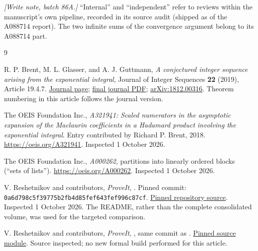 \documentclass[11pt,a4paper]{article}
\numberwithin{equation}{section}
\theoremstyle{definition}
\theoremstyle{remark}
\theoremstyle{definition}
\newcommand{\repoSHA}{\texttt{0a6d798c5f39775b2fb4d85fef643fef996c87cf}}
\begin{document}
\emph{[Write note, batch 86A.]} ``Internal'' and ``independent'' refer to
reviews within the manuscript's own pipeline, recorded in its source
audit (shipped as
 of the A088714 report). The
two infinite sums of the convergence argument belong to its A088714
part.

\begin{thebibliography}{9}

R. P. Brent, M. L. Glasser, and A. J. Guttmann,
\emph{A conjectured integer sequence arising from the exponential integral},
Journal of Integer Sequences \textbf{22} (2019), Article 19.4.7.
\href{https://cs.uwaterloo.ca/journals/JIS/VOL22/Brent/brent21.html}{Journal page};
\href{https://cs.uwaterloo.ca/journals/JIS/VOL22/Brent/brent21.pdf}{final journal PDF};
\href{https://arxiv.org/abs/1812.00316}{arXiv:1812.00316}.
Theorem numbering in this article follows the journal version.

The OEIS Foundation Inc.,
\emph{A321941: Scaled numerators in the asymptotic expansion of the Maclaurin
coefficients in a Hadamard product involving the exponential integral}.
Entry contributed by Richard P. Brent, 2018.
\url{https://oeis.org/A321941}. Inspected 1 October 2026.

The OEIS Foundation Inc.,
\emph{A000262}, partitions into linearly ordered blocks (``sets of lists'').
\url{https://oeis.org/A000262}. Inspected 1 October 2026.

V. Reshetnikov and contributors, \emph{ProveIt},
.
Pinned commit: \repoSHA.
\href{https://github.com/VladimirReshetnikov/ProveIt/blob/0a6d798c5f39775b2fb4d85fef643fef996c87cf/Analysis/Transseries/docs/series-and-transseries/Transseries_And_Inversion/README.md}{Pinned repository source}.
Inspected 1 October 2026. The README, rather than the complete consolidated
volume, was used for the targeted comparison.

V. Reshetnikov and contributors, \emph{ProveIt},
,
same commit as \cite{proveit-volume}.
\href{https://github.com/VladimirReshetnikov/ProveIt/blob/0a6d798c5f39775b2fb4d85fef643fef996c87cf/Analysis/FabiusFunction/Lean/FabiusFunction/QuadraticCoreCatalan.lean}{Pinned source module}.
Source inspected; no new formal build performed for this article.


\end{thebibliography}
\end{document}
